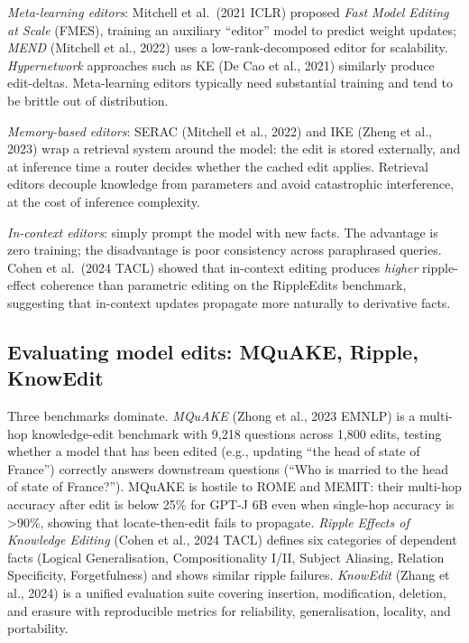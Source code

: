 \emph{Meta-learning editors}: Mitchell et al.~(2021 ICLR) proposed \emph{Fast Model Editing at Scale} (FMES), training an auxiliary ``editor'' model to predict weight updates; \emph{MEND} (Mitchell et al., 2022) uses a low-rank-decomposed editor for scalability. \emph{Hypernetwork} approaches such as KE (De Cao et al., 2021) similarly produce edit-deltas. Meta-learning editors typically need substantial training and tend to be brittle out of distribution.

\emph{Memory-based editors}: SERAC (Mitchell et al., 2022) and IKE (Zheng et al., 2023) wrap a retrieval system around the model: the edit is stored externally, and at inference time a router decides whether the cached edit applies. Retrieval editors decouple knowledge from parameters and avoid catastrophic interference, at the cost of inference complexity.

\emph{In-context editors}: simply prompt the model with new facts. The advantage is zero training; the disadvantage is poor consistency across paraphrased queries. Cohen et al.~(2024 TACL) showed that in-context editing produces \emph{higher} ripple-effect coherence than parametric editing on the RippleEdits benchmark, suggesting that in-context updates propagate more naturally to derivative facts.

\subsection{Evaluating model edits: MQuAKE, Ripple, KnowEdit}\label{evaluating-model-edits-mquake-ripple-knowedit}

Three benchmarks dominate. \emph{MQuAKE} (Zhong et al., 2023 EMNLP) is a multi-hop knowledge-edit benchmark with 9,218 questions across 1,800 edits, testing whether a model that has been edited (e.g., updating ``the head of state of France'') correctly answers downstream questions (``Who is married to the head of state of France?''). MQuAKE is hostile to ROME and MEMIT: their multi-hop accuracy after edit is below 25\% for GPT-J 6B even when single-hop accuracy is \textgreater90\%, showing that locate-then-edit fails to propagate. \emph{Ripple Effects of Knowledge Editing} (Cohen et al., 2024 TACL) defines six categories of dependent facts (Logical Generalisation, Compositionality I/II, Subject Aliasing, Relation Specificity, Forgetfulness) and shows similar ripple failures. \emph{KnowEdit} (Zhang et al., 2024) is a unified evaluation suite covering insertion, modification, deletion, and erasure with reproducible metrics for reliability, generalisation, locality, and portability.

